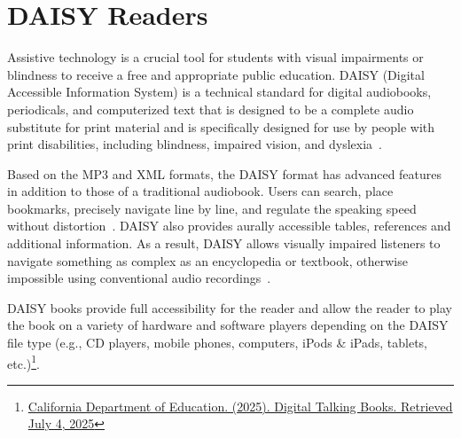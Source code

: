 \section{DAISY Readers}\label{text-to-speech-music-podcast}

Assistive technology is a crucial tool for students with visual impairments or blindness to receive a free and appropriate public education. DAISY (Digital Accessible Information System) is a technical standard for digital audiobooks, periodicals, and computerized text that is designed to be a complete audio substitute for print material and is specifically designed for use by people with print disabilities, including blindness, impaired vision, and dyslexia~\cite{Wikipedia2024}.

Based on the MP3 and XML formats, the DAISY format has advanced features in addition to those of a traditional audiobook. Users can search, place bookmarks, precisely navigate line by line, and regulate the speaking speed without distortion~\cite{Wikipedia2024}. DAISY also provides aurally accessible tables, references and additional information. As a result, DAISY allows visually impaired listeners to navigate something as complex as an encyclopedia or textbook, otherwise impossible using conventional audio recordings~\cite{MDPI2022}.

DAISY books provide full accessibility for the reader and allow the reader to play the book on a variety of hardware and software players depending on the DAISY file type (e.g., CD players, mobile phones, computers, iPods \& iPads, tablets, etc.)\footnote{\href{https://www.cde.ca.gov/re/pn/sm/dtbdefinitions.asp}{California Department of Education. (2025). Digital Talking Books. Retrieved July 4, 2025}}.


